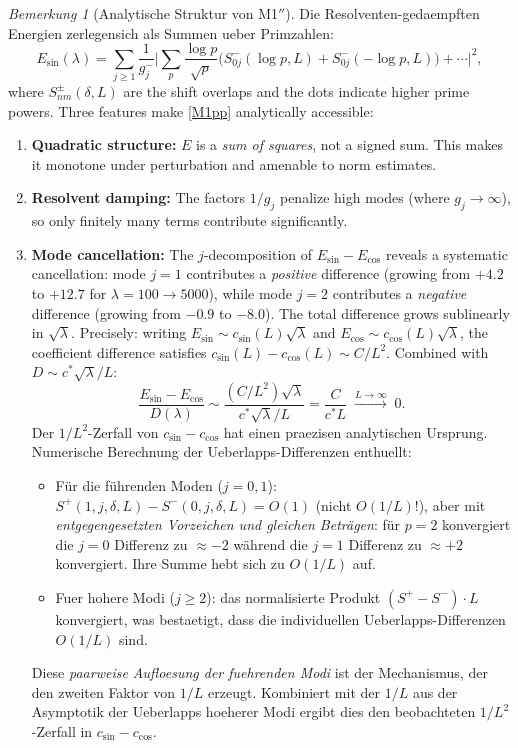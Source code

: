\documentclass[12pt,a4paper]{article}
\theoremstyle{definition}
\theoremstyle{remark}
\newtheorem{remark}[theorem]{Bemerkung}
\begin{document}
\begin{remark}[Analytische Struktur von M1$''$]
\label{rem:M1-analytical}
Die Resolventen-gedaempften Energien zerlegensich als Summen ueber Primzahlen:
\[
  E_{\sin}(\lambda) = \sum_{j \geq 1} \frac{1}{g_j^-}
  \biggl|\sum_p \frac{\log p}{\sqrt{p}}
  \bigl(S^-_{0j}(\log p, L) + S^-_{0j}(-\log p, L)\bigr) + \cdots\biggr|^2,
\]
where $S^\pm_{nm}(\delta, L)$ are the shift overlaps and the dots indicate higher prime powers. Three features make \ref{M1pp} analytically accessible:
\begin{enumerate}
  \item \textbf{Quadratic structure:} $E$ is a \emph{sum of squares}, not a signed sum. This makes it monotone under perturbation and amenable to norm estimates.
  \item \textbf{Resolvent damping:} The factors $1/g_j$ penalize high modes (where $g_j \to \infty$), so only finitely many terms contribute significantly.
  \item \textbf{Mode cancellation:} The $j$-decomposition of $E_{\sin} - E_{\cos}$ reveals a systematic cancellation: mode $j = 1$ contributes a \emph{positive} difference (growing from $+4.2$ to $+12.7$ for $\lambda = 100 \to 5000$), while mode $j = 2$ contributes a \emph{negative} difference (growing from $-0.9$ to $-8.0$). The total difference grows sublinearly in $\sqrt{\lambda}$. Precisely: writing $E_{\sin} \sim c_{\sin}(L)\sqrt{\lambda}$ and $E_{\cos} \sim c_{\cos}(L)\sqrt{\lambda}$, the coefficient difference satisfies $c_{\sin}(L) - c_{\cos}(L) \sim C/L^2$. Combined with $D \sim c^*\sqrt{\lambda}/L$:
  \[
    \frac{E_{\sin} - E_{\cos}}{D(\lambda)} \sim \frac{(C/L^2)\sqrt{\lambda}}{c^*\sqrt{\lambda}/L} = \frac{C}{c^* L} \;\xrightarrow{L \to \infty}\; 0.
  \]
  Der $1/L^2$-Zerfall von $c_{\sin} - c_{\cos}$ hat einen praezisen analytischen Ursprung. Numerische Berechnung der Ueberlapps-Differenzen enthuellt:
  \begin{itemize}
    \item Für die führenden Moden ($j = 0, 1$): $S^+(1,j,\delta,L) - S^-(0,j,\delta,L) = O(1)$ (nicht $O(1/L)$!), aber mit \emph{entgegengesetzten Vorzeichen und gleichen Beträgen}: für $p = 2$ konvergiert die $j = 0$ Differenz zu $\approx -2$ während die $j = 1$ Differenz zu $\approx +2$ konvergiert. Ihre Summe hebt sich zu $O(1/L)$ auf.
    \item Fuer hohere Modi ($j \geq 2$): das normalisierte Produkt $(S^+ - S^-) \cdot L$ konvergiert, was bestaetigt, dass die individuellen Ueberlapps-Differenzen $O(1/L)$ sind.
  \end{itemize}
  Diese \emph{paarweise Aufloesung der fuehrenden Modi} ist der Mechanismus, der den zweiten Faktor von $1/L$ erzeugt. Kombiniert mit der $1/L$ aus der Asymptotik der Ueberlapps hoeherer Modi ergibt dies den beobachteten $1/L^2$-Zerfall in $c_{\sin} - c_{\cos}$.
\end{enumerate}
\end{remark}
\end{document}
